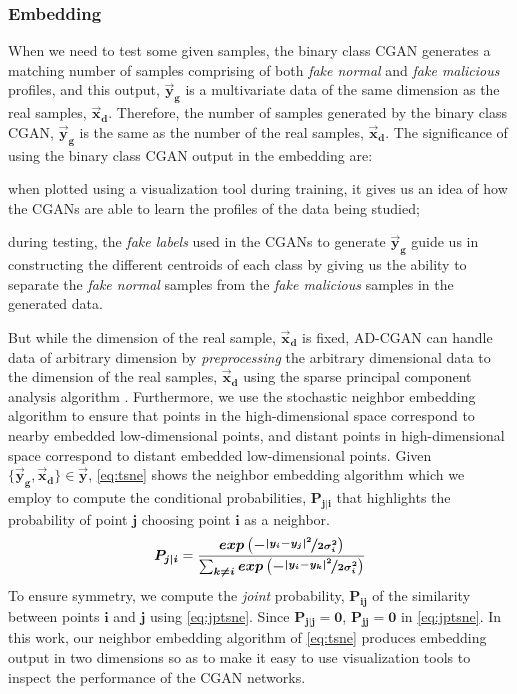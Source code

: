 \subsubsection{Embedding} 
\label{subsub:tsne}
When we need to test some given samples, the binary class CGAN generates a matching number of samples comprising of both \textit{fake normal} and \textit{fake malicious} profiles, and this output, $ \bm{\vec{y}_g} $ is a multivariate data of the same dimension as the real samples, $ \bm{\vec{x}_d} $. Therefore, the number of samples generated by the binary class CGAN, $ \bm{\vec{y}_g} $ is the same as the number of the real samples, $ \bm{\vec{x}_d} $. The significance of using the binary class CGAN output in the embedding are: 
\begin{enumerate*}[label={\alph*)},font={\bfseries}]
	\item when plotted using a visualization tool during training, it gives us an idea of how the CGANs are able to learn the profiles of the data being studied;
	\item during testing, the \textit{fake labels} used in the CGANs to generate $ \bm{\vec{y}_g} $ guide us in constructing the different centroids of each class by giving us the ability to separate the \textit{fake normal} samples from the \textit{fake malicious} samples in the generated data.
\end{enumerate*} 
But while the dimension of the real sample, $ \bm{\vec{x}_d} $ is fixed, AD-CGAN can handle data of arbitrary dimension by \textit{preprocessing} the arbitrary dimensional data to the dimension of the real samples, $ \bm{\vec{x}_d} $ using the sparse principal component analysis algorithm \cite{zou2006sparse}. Furthermore, we use the stochastic neighbor embedding algorithm to ensure that points in the high-dimensional space correspond to nearby embedded low-dimensional points, and distant points in high-dimensional space correspond to distant embedded low-dimensional points. Given $ \bm{ \{\vec{y}_g, \vec{x}_d\} \in \vec{y}  } $, \eqref{eq:tsne} shows the neighbor embedding algorithm which we employ to compute the conditional probabilities, $ \bm{P_{j|i}} $ that highlights the probability of  point $ \bm{j} $ choosing point $ \bm{i} $ as a neighbor.
\begin{equation}
	\bm{P_{j|i}} = \bm{\frac{exp\left(- \nicefrac{\lvert y_i - y_j\rvert ^2}{2\sigma_i^2}    \right)}{ \sum_{k\neq i} exp\left(- \nicefrac{\lvert y_i - y_k\rvert ^2}{2\sigma_i^2}    \right)}}
	\label{eq:tsne} 
\end{equation}
To ensure symmetry, we compute the \textit{joint} probability, $ \bm{P_{ij} }$ of the similarity between points $ \bm{i} $ and $ \bm{j} $ using \eqref{eq:jptsne}. Since $ {\bm{P_{j|j}=0} }$, $ \bm{P_{jj}=0} $ in \eqref{eq:jptsne}. In this work, our neighbor embedding algorithm of \eqref{eq:tsne} produces embedding output in two dimensions so as to make it easy to use visualization tools to inspect the performance of the CGAN networks. 

